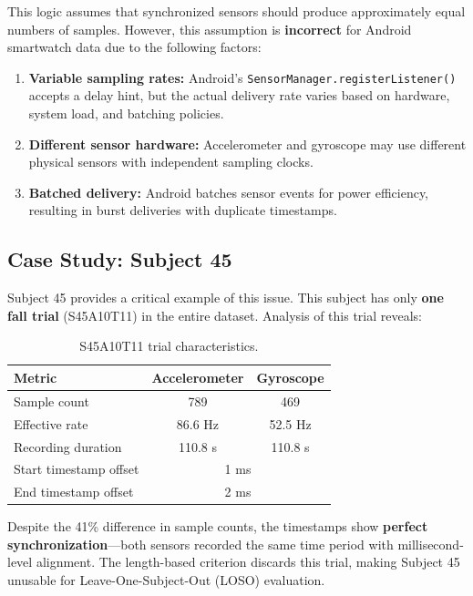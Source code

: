 This logic assumes that synchronized sensors should produce approximately equal numbers of samples. However, this assumption is \textbf{incorrect} for Android smartwatch data due to the following factors:

\begin{enumerate}[label=(\roman*)]
    \item \textbf{Variable sampling rates:} Android's \texttt{SensorManager.registerListener()} accepts a delay hint, but the actual delivery rate varies based on hardware, system load, and batching policies.
    \item \textbf{Different sensor hardware:} Accelerometer and gyroscope may use different physical sensors with independent sampling clocks.
    \item \textbf{Batched delivery:} Android batches sensor events for power efficiency, resulting in burst deliveries with duplicate timestamps.
\end{enumerate}

\subsection{Case Study: Subject 45}

Subject 45 provides a critical example of this issue. This subject has only \textbf{one fall trial} (S45A10T11) in the entire dataset. Analysis of this trial reveals:

\begin{table}[h]
    \centering
    \caption{S45A10T11 trial characteristics.}
    \label{tab:s45_analysis}
    \begin{tabular}{lcc}
        \toprule
        Metric & Accelerometer & Gyroscope \\
        \midrule
        Sample count & 789 & 469 \\
        Effective rate & 86.6 Hz & 52.5 Hz \\
        Recording duration & 110.8 s & 110.8 s \\
        Start timestamp offset & \multicolumn{2}{c}{1 ms} \\
        End timestamp offset & \multicolumn{2}{c}{2 ms} \\
        \bottomrule
    \end{tabular}
\end{table}

Despite the 41\% difference in sample counts, the timestamps show \textbf{perfect synchronization}---both sensors recorded the same time period with millisecond-level alignment. The length-based criterion discards this trial, making Subject 45 unusable for Leave-One-Subject-Out (LOSO) evaluation.

